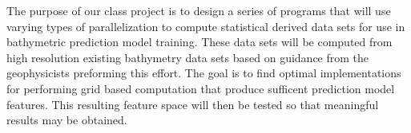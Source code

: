 \par
The purpose of our class project is to design a series of programs that will use varying types of parallelization to compute statistical derived data sets for use in bathymetric prediction model training. 
These data sets will be computed from high resolution existing bathymetry data sets based on guidance from the geophysicists preforming this effort. 
The goal is to find optimal implementations for performing grid based computation that produce sufficent prediction model features.
This resulting feature space will then be tested so that meaningful results may be obtained.
